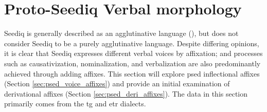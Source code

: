
\section{Proto-Seediq Verbal morphology} \label{sec:psed_aff}

Seediq is generally described as an agglutinative language (\cite{tsukida2012}), but \textcite{holmer1996parametric} does not consider Seediq to be a purely agglutinative language. Despite differing opinions, it is clear that Seediq expresses different verbal voices by affixation; and processes such as causativization, nominalization, and verbalization are also predominantly achieved through adding affixes. This section will explore \acl{psed} inflectional affixes (Section \ref{sec:psed_voice_affixes}) and provide an initial examination of derivational affixes (Section \ref{sec:psed_deri_affixes}). The data in this section primarily comes from the \acl{tg} and \acl{etr} dialects.

